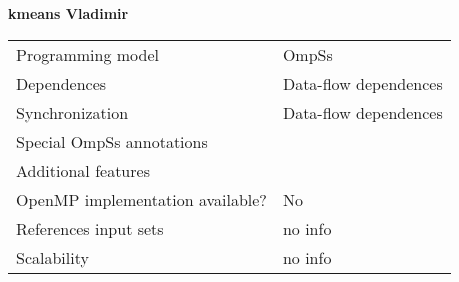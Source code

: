 \section*{}
\label{kmeans_vladimir}
\centering
\Huge
\textbf{kmeans Vladimir}

\begin{table}[h!]
  \large
  \centering
  \begin{tabular}{|l|l|}
    \hline
    Programming model                & OmpSs \\
    Dependences                      & Data-flow dependences \\
    Synchronization                  & Data-flow dependences \\
    Special OmpSs annotations        &  \\
    Additional features              &  \\
    OpenMP implementation available? & No \\
    References input sets            & no info \\
    Scalability                      & no info \\
    \hline
  \end{tabular}
\end{table}

\newpage
